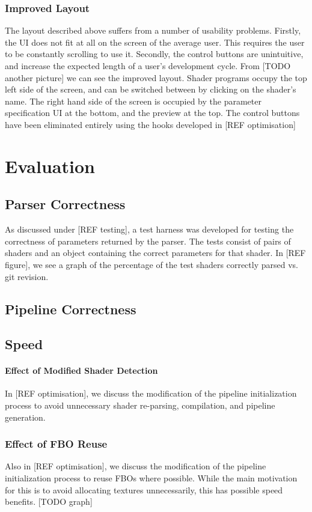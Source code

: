 \documentclass[12pt,twoside,notitlepage]{report}
\begin{document}
\subsection{Improved Layout}
The layout described above suffers from a number of usability problems. Firstly, the UI does not fit at all on the screen of the average user. This requires the user to be constantly scrolling to use it. Secondly, the control buttons are unintuitive, and increase the expected length of a user's development cycle. From [TODO another picture] we can see the improved layout. Shader programs occupy the top left side of the screen, and can be switched between by clicking on the shader's name. The right hand side of the screen is occupied by the parameter specification UI at the bottom, and the preview at the top. The control buttons have been eliminated entirely using the hooks developed in [REF optimisation]

\cleardoublepage
\chapter{Evaluation}

\section{Parser Correctness}
As discussed under [REF testing], a test harness was developed for testing the correctness of parameters returned by the parser. The tests consist of pairs of shaders and an object containing the correct parameters for that shader. In [REF figure], we see a graph of the percentage of the test shaders correctly parsed vs. git revision.


\section{Pipeline Correctness}

\section{Speed}
\subsubsection{Effect of Modified Shader Detection}
In [REF optimisation], we discuss the modification of the pipeline initialization process to avoid unnecessary shader re-parsing, compilation, and pipeline generation. 

\subsection{Effect of FBO Reuse}
Also in [REF optimisation], we discuss the modification of the pipeline initialization process to reuse FBOs where possible. While the main motivation for this is to avoid allocating textures unnecessarily, this has possible speed benefits. [TODO graph]
\end{document}
